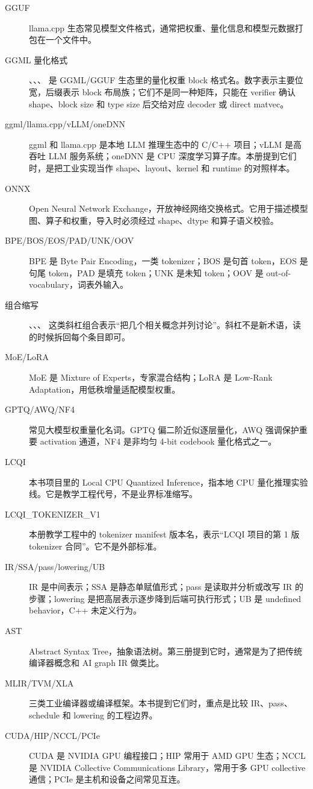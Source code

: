 \begin{description}
  \item[GGUF] llama.cpp 生态常见模型文件格式，通常把权重、量化信息和模型元数据打包在一个文件中。
  \item[GGML 量化格式] 、、、 是 GGML/GGUF 生态里的量化权重 block 格式名。数字表示主要位宽，后缀表示 block 布局族；它们不是同一种矩阵，只能在 verifier 确认 shape、block size 和 type size 后交给对应 decoder 或 direct matvec。
  \item[ggml/llama.cpp/vLLM/oneDNN] ggml 和 llama.cpp 是本地 LLM 推理生态中的 C/C++ 项目；vLLM 是高吞吐 LLM 服务系统；oneDNN 是 CPU 深度学习算子库。本册提到它们时，是把工业实现当作 shape、layout、kernel 和 runtime 的对照样本。
  \item[ONNX] Open Neural Network Exchange，开放神经网络交换格式。它用于描述模型图、算子和权重，导入时必须经过 shape、dtype 和算子语义校验。
  \item[BPE/BOS/EOS/PAD/UNK/OOV] BPE 是 Byte Pair Encoding，一类 tokenizer；BOS 是句首 token，EOS 是句尾 token，PAD 是填充 token；UNK 是未知 token；OOV 是 out-of-vocabulary，词表外输入。
  \item[组合缩写] 、、、 这类斜杠组合表示“把几个相关概念并列讨论”。斜杠不是新术语，读的时候拆回每个条目即可。
  \item[MoE/LoRA] MoE 是 Mixture of Experts，专家混合结构；LoRA 是 Low-Rank Adaptation，用低秩增量适配模型权重。
  \item[GPTQ/AWQ/NF4] 常见大模型权重量化名词。GPTQ 偏二阶近似逐层量化，AWQ 强调保护重要 activation 通道，NF4 是非均匀 4-bit codebook 量化格式之一。
  \item[LCQI] 本书项目里的 Local CPU Quantized Inference，指本地 CPU 量化推理实验线。它是教学工程代号，不是业界标准缩写。
  \item[LCQI\_TOKENIZER\_V1] 本册教学工程中的 tokenizer manifest 版本名，表示“LCQI 项目的第 1 版 tokenizer 合同”。它不是外部标准。
  \item[IR/SSA/pass/lowering/UB] IR 是中间表示；SSA 是静态单赋值形式；pass 是读取并分析或改写 IR 的步骤；lowering 是把高层表示逐步降到后端可执行形式；UB 是 undefined behavior，C++ 未定义行为。
  \item[AST] Abstract Syntax Tree，抽象语法树。第三册提到它时，通常是为了把传统编译器概念和 AI graph IR 做类比。
  \item[MLIR/TVM/XLA] 三类工业编译器或编译框架。本书提到它们时，重点是比较 IR、pass、schedule 和 lowering 的工程边界。
  \item[CUDA/HIP/NCCL/PCIe] CUDA 是 NVIDIA GPU 编程接口；HIP 常用于 AMD GPU 生态；NCCL 是 NVIDIA Collective Communications Library，常用于多 GPU collective 通信；PCIe 是主机和设备之间常见互连。

\end{description}

